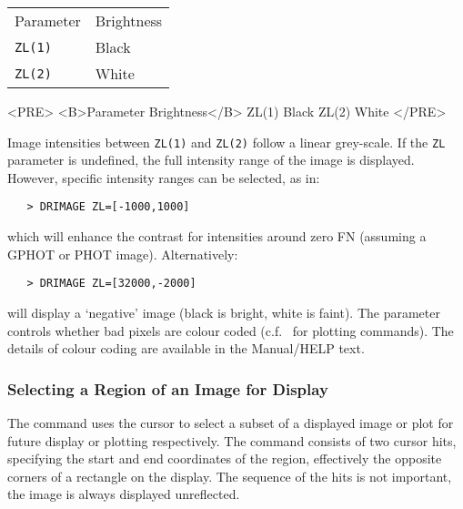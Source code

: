 \begin{latexonly}
\begin{tabular}{ll}
Parameter   & Brightness\\
{\tt ZL(1)} & Black\\
{\tt ZL(2)} & White\\
\end{tabular}
\end{latexonly}

\begin{htmlonly}
\begin{rawhtml}
<PRE>
<B>Parameter    Brightness</B>
  ZL(1)      Black
  ZL(2)      White
</PRE>
\end{rawhtml}
\end{htmlonly}

Image intensities between \verb+ZL(1)+ and \verb+ZL(2)+ follow a linear
grey-scale.  If the \verb+ZL+ parameter is undefined, the full intensity range
of the image is displayed.  However, specific intensity ranges can be selected,
as in:

\begin{verbatim}
   > DRIMAGE ZL=[-1000,1000]
\end{verbatim}

which will enhance the contrast for intensities around zero FN (assuming a
GPHOT or PHOT image).  Alternatively:

\begin{verbatim}
   > DRIMAGE ZL=[32000,-2000]
\end{verbatim}

will display a `negative' image (black is bright, white is faint)\@.
The 
 parameter controls whether bad pixels are colour coded
(c.f.\ 
 for plotting commands)\@.  The details of colour coding are
available in the Manual/HELP text.

\subsubsection{\label{subse:culimits}Selecting a Region of an Image for Display}

The 
 command uses the cursor to select a subset of a displayed
image or plot for future display or plotting respectively.  The command
consists of two cursor hits, specifying the start and end coordinates of the
region, effectively the opposite corners of a rectangle on the display.
The sequence of the hits is not important, the image is always displayed
unreflected.

